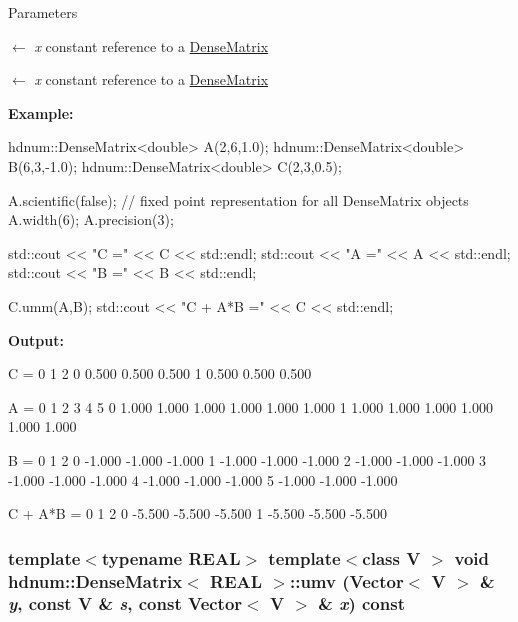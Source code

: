 \begin{DoxyParams}{Parameters}
\item[\mbox{$\leftarrow$} {\em x}]constant reference to a \hyperlink{classhdnum_1_1DenseMatrix}{DenseMatrix} \item[\mbox{$\leftarrow$} {\em x}]constant reference to a \hyperlink{classhdnum_1_1DenseMatrix}{DenseMatrix}\end{DoxyParams}
{\bfseries Example:} 
\begin{DoxyCode}
  hdnum::DenseMatrix<double> A(2,6,1.0);
  hdnum::DenseMatrix<double> B(6,3,-1.0);
  hdnum::DenseMatrix<double> C(2,3,0.5);

  A.scientific(false); // fixed point representation for all DenseMatrix objects
  A.width(6);
  A.precision(3);

  std::cout << "C =" << C << std::endl;
  std::cout << "A =" << A << std::endl;
  std::cout << "B =" << B << std::endl;

  C.umm(A,B);
  std::cout << "C + A*B =" << C << std::endl;
\end{DoxyCode}


{\bfseries Output:} \begin{DoxyVerb}
C =
                  0      1      2 
          0   0.500  0.500  0.500 
          1   0.500  0.500  0.500 

A =
                  0      1      2      3      4      5 
          0   1.000  1.000  1.000  1.000  1.000  1.000 
          1   1.000  1.000  1.000  1.000  1.000  1.000 

B =
                  0      1      2 
          0  -1.000 -1.000 -1.000 
          1  -1.000 -1.000 -1.000 
          2  -1.000 -1.000 -1.000 
          3  -1.000 -1.000 -1.000 
          4  -1.000 -1.000 -1.000 
          5  -1.000 -1.000 -1.000 

C + A*B =
                  0      1      2 
          0  -5.500 -5.500 -5.500 
          1  -5.500 -5.500 -5.500 
	  \end{DoxyVerb}
 \hypertarget{classhdnum_1_1DenseMatrix_aabf780a319d2d9d4379f8d5832c1a99c}{
\subsubsection[{umv}]{\setlength{\rightskip}{0pt plus 5cm}template$<$typename REAL$>$ template$<$class V $>$ void {\bf hdnum::DenseMatrix}$<$ REAL $>$::umv ({\bf Vector}$<$ V $>$ \& {\em y}, \/  const V \& {\em s}, \/  const {\bf Vector}$<$ V $>$ \& {\em x}) const}}
\label{classhdnum_1_1DenseMatrix_aabf780a319d2d9d4379f8d5832c1a99c}



